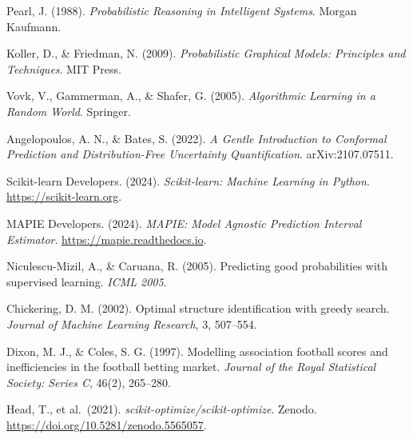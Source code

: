 \documentclass[12pt, a4paper]{article}
\begin{document}
\begin{enumerate}[label={[\arabic*]}]

  \item Pearl, J. (1988). \textit{Probabilistic Reasoning in Intelligent Systems}. Morgan Kaufmann.

  \item Koller, D., \& Friedman, N. (2009). \textit{Probabilistic Graphical Models: Principles and Techniques}. MIT Press.

  \item Vovk, V., Gammerman, A., \& Shafer, G. (2005). \textit{Algorithmic Learning in a Random World}. Springer.

  \item Angelopoulos, A. N., \& Bates, S. (2022). \textit{A Gentle Introduction to Conformal Prediction and Distribution-Free Uncertainty Quantification}. arXiv:2107.07511.

  \item Scikit-learn Developers. (2024). \textit{Scikit-learn: Machine Learning in Python}. \url{https://scikit-learn.org}.

  \item MAPIE Developers. (2024). \textit{MAPIE: Model Agnostic Prediction Interval Estimator}. \url{https://mapie.readthedocs.io}.

  \item Niculescu-Mizil, A., \& Caruana, R. (2005). Predicting good probabilities with supervised learning. \textit{ICML 2005}.

  \item Chickering, D. M. (2002). Optimal structure identification with greedy search. \textit{Journal of Machine Learning Research}, 3, 507--554.

  \item Dixon, M. J., \& Coles, S. G. (1997). Modelling association football scores and inefficiencies in the football betting market. \textit{Journal of the Royal Statistical Society: Series C}, 46(2), 265--280.

  \item Head, T., et al.\ (2021). \textit{scikit-optimize/scikit-optimize}. Zenodo. \url{https://doi.org/10.5281/zenodo.5565057}.

\end{enumerate}
\end{document}
